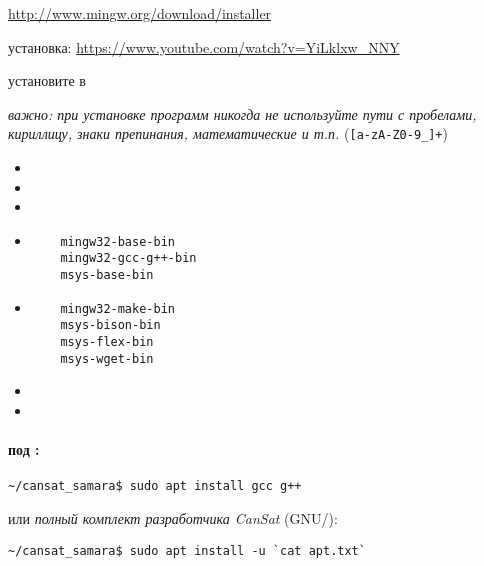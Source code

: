 \clearpage
{}

\url{http://www.mingw.org/download/installer}

\bigskip
установка: \url{https://www.youtube.com/watch?v=YiLklxw_NNY}

\bigskip
установите в 

\bigskip\noindent
\emph{важно: при установке программ никогда не используйте пути с пробелами, кириллицу, знаки препинания, математические и т.п.} (\verb|[a-zA-Z0-9_]+|)

\begin{itemize}
\item {}
\item {}
\item {}
\clearpage
\item {}
\begin{verbatim}
    mingw32-base-bin
    mingw32-gcc-g++-bin
    msys-base-bin
\end{verbatim}
\item {}
\begin{verbatim}
    mingw32-make-bin
    msys-bison-bin
    msys-flex-bin
    msys-wget-bin
\end{verbatim}
\item {}
\item {}
\end{itemize}

\clearpage
\paragraph{под \linux:}
\begin{verbatim}
~/cansat_samara$ sudo apt install gcc g++ 
\end{verbatim}
или \emph{полный комплект разработчика CanSat} (GNU/\linux):
\begin{verbatim}
~/cansat_samara$ sudo apt install -u `cat apt.txt`
\end{verbatim}
